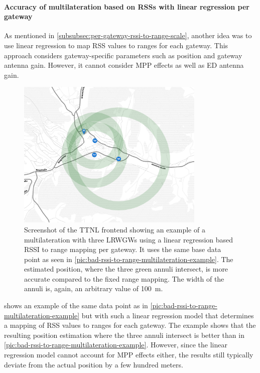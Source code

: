 \paragraph{Accuracy of multilateration based on \aclp{RSS} with linear regression per gateway}\label{subsubsec:conclusion-rssi-linear-regression}

As mentioned in \cref{subsubsec:per-gateway-rssi-to-range-scale}, another idea was to use linear regression to map \ac{RSS} values to ranges for each gateway.
This approach considers gateway-specific parameters such as position and gateway antenna gain.
However, it cannot consider \ac{MPP} effects as well as \acl{ED} antenna gain.

\begin{figure}[htbp]
    \centering
    \includegraphics[width=0.8\textwidth]{pictures/ttn-locator/frontend/multilateration/rssi_range_multilateration_regression_example.png}
    \caption{
        Screenshot of the \ac{TTNL} frontend showing an example of a multilateration with three \aclp{LRWGW} using a linear regression based \ac{RSSI} to range mapping per gateway.
        It uses the same base data point as seen in \cref{pic:bad-rssi-to-range-multilateration-example}.
        The estimated position, where the three green annuli intersect, is more accurate compared to the fixed range mapping.
        The width of the annuli is, again, an arbitrary value of \SI{100}{\meter}.
    }\label{pic:rssi-to-range-multilateration-example-with-linear-regression}
\end{figure}

 shows an example of the same data point as in \cref{pic:bad-rssi-to-range-multilateration-example} but with such a linear regression model that determines a mapping of \ac{RSS} values to ranges for each gateway.
The example shows that the resulting position estimation where the three annuli intersect is better than in \cref{pic:bad-rssi-to-range-multilateration-example}.
However, since the linear regression model cannot account for \ac{MPP} effects either, the results still typically deviate from the actual position by a few hundred meters.


